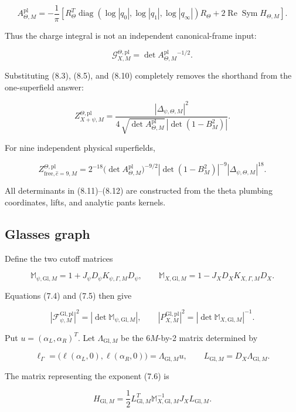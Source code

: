 \documentclass[11pt]{article}
\begin{document}
\[
\boxed{
 A_{\Theta,M}^{\mathrm{pl}}
 =-\frac1\pi\left[
 R_\Theta^T
 \operatorname{diag}(\log|q_0|,\log|q_1|,\log|q_\infty|)
 R_\Theta
 +2\operatorname{Re}\operatorname{Sym}H_{\Theta,M}
 \right].}
\tag{8.9}
\]

Thus the charge integral is not an independent canonical-frame input:

\[
 \mathcal G_{X,M}^{\Theta,\mathrm{pl}}
 =\det A_{\Theta,M}^{\mathrm{pl}}{}^{-1/2}.
\tag{8.10}
\]

Substituting (8.3), (8.5), and (8.10) completely removes the shorthand from
the one-superfield answer:

\[
\boxed{
 Z_{X+\psi,M}^{\Theta,\mathrm{pl}}
 =\frac{|\Delta_{\psi,\Theta,M}|^2}
 {4\,\sqrt{\det A_{\Theta,M}^{\mathrm{pl}}}\,
  |\det(1-B_M^2)|}.}
\tag{8.11}
\]

For nine independent physical superfields,

\[
\boxed{
 Z_{\mathrm{free},\widehat c=9,M}^{\Theta,\mathrm{pl}}
 =2^{-18}
  \bigl(\det A_{\Theta,M}^{\mathrm{pl}}\bigr)^{-9/2}
  |\det(1-B_M^2)|^{-9}
  |\Delta_{\psi,\Theta,M}|^{18}.}
\tag{8.12}
\]

All determinants in (8.11)--(8.12) are constructed from the theta plumbing
coordinates, lifts, and analytic pants kernels.

\subsection{Glasses graph}

Define the two cutoff matrices

\[
 \mathbb M_{\psi,\mathrm{Gl},M}
 =1+J_\psi D_\psi K_{\psi,\Gamma,M}D_\psi,
 \qquad
 \mathbb M_{X,\mathrm{Gl},M}
 =1-J_XD_XK_{X,\Gamma,M}D_X.
\tag{8.13}
\]

Equations (7.4) and (7.5) then give

\[
 |\mathcal F_{\psi,M}^{\mathrm{Gl},\mathrm{pl}}|^2
 =|\det\mathbb M_{\psi,\mathrm{Gl},M}|,
 \qquad
 |P_{X,M}^{\mathrm{Gl},\mathrm{pl}}|^2
 =|\det\mathbb M_{X,\mathrm{Gl},M}|^{-1}.
\tag{8.14}
\]

Put \(u=(\alpha_L,\alpha_R)^T\).  Let
\(\Lambda_{\mathrm{Gl},M}\) be the \(6M\)-by-2 matrix determined by

\[
 \ell_\Gamma
 =\bigl(\ell(\alpha_L,0),\ell(\alpha_R,0)\bigr)
 =\Lambda_{\mathrm{Gl},M}u,
 \qquad L_{\mathrm{Gl},M}=D_X\Lambda_{\mathrm{Gl},M}.
\tag{8.15}
\]

The matrix representing the exponent (7.6) is

\[
 H_{\mathrm{Gl},M}
 =\frac12L_{\mathrm{Gl},M}^T
  \mathbb M_{X,\mathrm{Gl},M}^{-1}J_X
  L_{\mathrm{Gl},M}.
\tag{8.16}
\]
\end{document}
